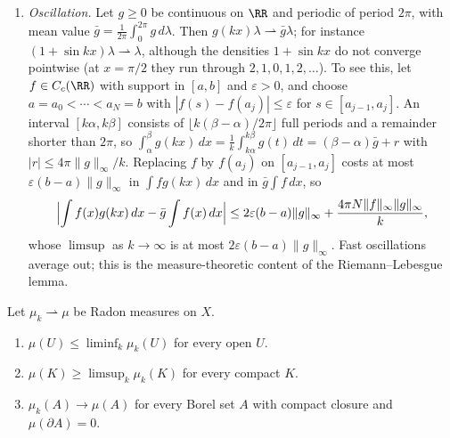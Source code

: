 \begin{example}
\begin{enumerate}
$|\int_0^kf\,d\lambda|/k \leq \|f\|_1/k$. All these measures have total mass $1$, the limit has mass $0$: mass can escape to infinity, by moving away or by spreading out.
\item \emph{Oscillation.} Let $g \geq 0$ be continuous on $\RR$ and periodic of period $2\pi$, with mean value $\bar g = \frac1{2\pi}\int_0^{2\pi}g\,d\lambda$. Then $g(kx)\lambda \rightharpoonup \bar g\lambda$; for
instance $(1 + \sin kx)\lambda \rightharpoonup \lambda$, although the densities $1 + \sin kx$ do not converge pointwise (at $x = \pi/2$ they run through $2, 1, 0, 1, 2, \ldots$). To see this, let
$f \in C_c(\RR)$ with support in $[a, b]$ and $\varepsilon > 0$, and choose $a = a_0 < \cdots < a_N = b$ with $|f(s) - f(a_j)| \leq \varepsilon$ for $s \in [a_{j-1}, a_j]$. An interval
$[k\alpha, k\beta]$ consists of $\lfloor k(\beta - \alpha)/2\pi\rfloor$ full periods and a remainder shorter than $2\pi$, so
$\int_\alpha^\beta g(kx)\,dx = \frac1k\int_{k\alpha}^{k\beta}g(t)\,dt = (\beta - \alpha)\bar g + r$ with $|r| \leq 4\pi\|g\|_\infty/k$. Replacing $f$ by $f(a_j)$ on $[a_{j-1}, a_j]$ costs at most
$\varepsilon(b - a)\|g\|_\infty$ in $\int fg(kx)\,dx$ and in $\bar g\int f\,dx$, so
\[
\Bigl|\int f(x)g(kx)\,dx - \bar g\int f(x)\,dx\Bigr| \leq 2\varepsilon(b - a)\|g\|_\infty + \frac{4\pi N\|f\|_\infty\|g\|_\infty}{k},
\]
whose $\limsup$ as $k \to \infty$ is at most $2\varepsilon(b - a)\|g\|_\infty$. Fast oscillations average out; this is the measure-theoretic content of the Riemann--Lebesgue lemma.
\end{enumerate}
\end{example}

\begin{proposition}\label{radon-measures:proposition-weak-convergence-sets}
Let $\mu_k \rightharpoonup \mu$ be Radon measures on $X$.
\begin{enumerate}
\item $\mu(U) \leq \liminf_k\mu_k(U)$ for every open $U$.
\item $\mu(K) \geq \limsup_k\mu_k(K)$ for every compact $K$.
\item $\mu_k(A) \to \mu(A)$ for every Borel set $A$ with compact closure and $\mu(\partial A) = 0$.
\end{enumerate}
\end{proposition}

